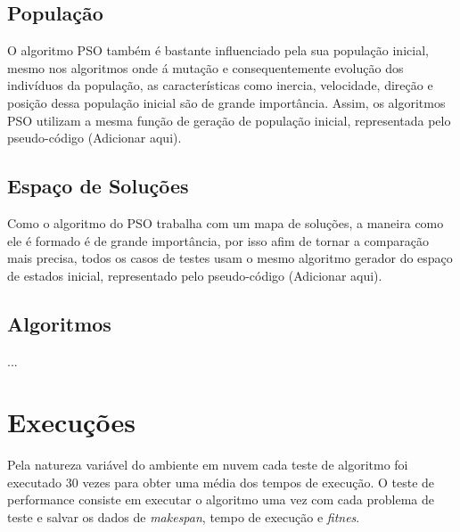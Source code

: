     \subsection{População}
        O algoritmo PSO também é bastante influenciado pela sua população inicial, mesmo nos algoritmos onde á mutação e consequentemente evolução dos indivíduos da população, as características como inercia, velocidade, direção e posição dessa população inicial são de grande importância. Assim, os algoritmos PSO utilizam a mesma função de geração de população inicial, representada pelo pseudo-código (Adicionar aqui).


    \subsection{Espaço de Soluções}


        Como o algoritmo do PSO trabalha com um mapa de soluções, a maneira como ele é formado é de grande importância, por isso afim de tornar a comparação mais precisa, todos os casos de testes usam o mesmo algoritmo gerador do espaço de estados inicial, representado pelo pseudo-código (Adicionar aqui).


    \subsection{Algoritmos}
        ...
    



\section{Execuções}
    Pela natureza variável do ambiente em nuvem cada teste de algoritmo foi executado 30 vezes para obter uma média dos tempos de execução. O teste de performance consiste em executar o algoritmo uma vez com cada problema de teste e salvar os dados de \textit{makespan}, tempo de execução e \textit{fitnes}.

